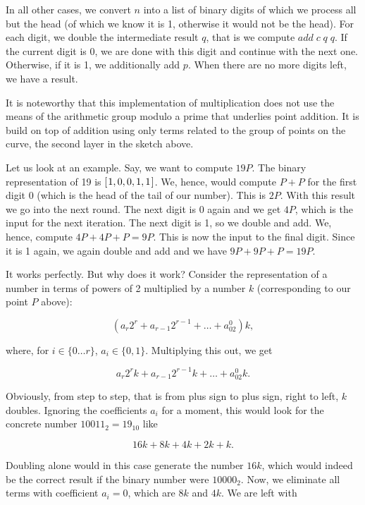 \documentclass[tikz]{scrreprt}
\newcommand{\Varid}[1]{\mathit{#1}}
\begin{document}
In all other cases, we convert $n$ into a list
of binary digits of which we process all but the head
(of which we know it is 1, otherwise it would not be the head).
For each digit, we double the intermediate result $q$,
that is we compute \ensuremath{\Varid{add}\;\Varid{c}\;\Varid{q}\;\Varid{q}}.
If the current digit is 0, we are done with this digit and continue
with the next one.
Otherwise, if it is 1, we additionally add $p$.
When there are no more digits left,
we have a result.

It is noteworthy that this implementation of multiplication
does not use the means of the arithmetic group modulo a prime
that underlies point addition. It is build on top of addition
using only terms related to the group of points on the curve,
the second layer in the sketch above.

Let us look at an example. Say, we want to
compute $19P$.
The binary representation of 19 is \ensuremath{[\mskip1.5mu \mathrm{1},\mathrm{0},\mathrm{0},\mathrm{1},\mathrm{1}\mskip1.5mu]}.
We, hence, would compute $P+P$ for the first digit 0 
(which is the head of the tail of our number).
This is $2P$. With this result we go into the next round.
The next digit is 0 again and we get $4P$,
which is the input for the next iteration.
The next digit is 1, so we double and add.
We, hence, compute $4P+4P+P = 9P$.
This is now the input to the final digit.
Since it is 1 again, we again double and add
and we have $9P+9P+P=19P$.

It works perfectly. But why does it work? Consider
the representation of a number in terms of
powers of 2 multiplied by a number $k$
(corresponding to our point $P$ above):

\[
(a_r2^r + a_{r-1}2^{r-1} + \dots + a_02^0)k,
\]

where, for $i \in \lbrace 0\dots r\rbrace$, 
$a_i \in \lbrace 0,1\rbrace$.
Multiplying this out, we get

\[
a_r2^rk + a_{r-1}2^{r-1}k + \dots + a_02^0k.
\]

Obviously, from step to step, that is from plus sign
to plus sign, right to left, $k$ doubles. 
Ignoring the coefficients $a_i$
for a moment, this would look for the concrete number
$10011_2 = 19_{10}$ like

\[
16k + 8k + 4k + 2k + k.
\]

Doubling alone would in this case generate the number $16k$,
which would indeed be the correct result if the 
binary number were $10000_2$.
Now, we eliminate all terms with coefficient $a_i = 0$,
which are $8k$ and $4k$. We are left with
\end{document}
